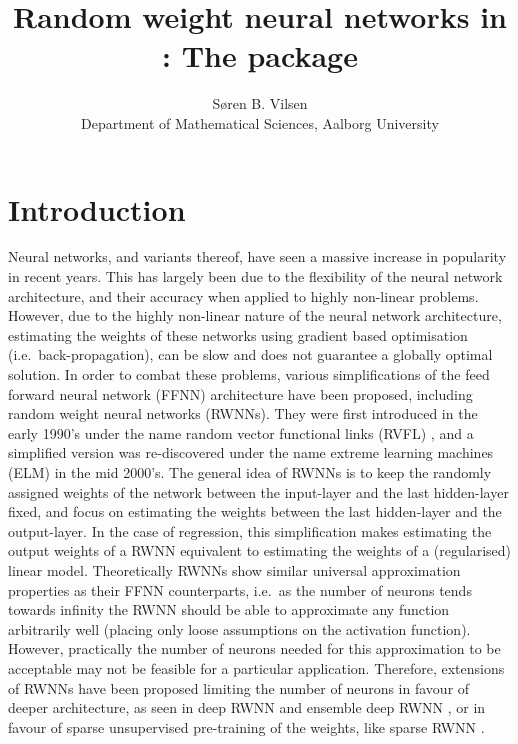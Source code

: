 \documentclass[
]{jss}
\author{
Søren B. Vilsen\\Department of Mathematical Sciences, Aalborg University
}
\title{Random weight neural networks in \proglang{R}: The \pkg{RWNN}
package}
\begin{document}
\hypertarget{introduction}{%
\section{Introduction}\label{introduction}}

Neural networks, and variants thereof, have seen a massive increase in
popularity in recent years. This has largely been due to the flexibility
of the neural network architecture, and their accuracy when applied to
highly non-linear problems. However, due to the highly non-linear nature
of the neural network architecture, estimating the weights of these
networks using gradient based optimisation (i.e.~back-propagation), can
be slow and does not guarantee a globally optimal solution. In order to
combat these problems, various simplifications of the feed forward
neural network (FFNN) architecture have been proposed, including random
weight neural networks (RWNNs). They were first introduced in the early
1990's under the name random vector functional links (RVFL)
\citep[\citet{Pao1994}]{Schmidt1992}, and a simplified version was
re-discovered under the name extreme learning machines (ELM)
\citep{Huang2006} in the mid 2000's. The general idea of RWNNs is to
keep the randomly assigned weights of the network between the
input-layer and the last hidden-layer fixed, and focus on estimating the
weights between the last hidden-layer and the output-layer. In the case
of regression, this simplification makes estimating the output weights
of a RWNN equivalent to estimating the weights of a (regularised) linear
model. Theoretically RWNNs show similar universal approximation
properties as their FFNN counterparts, i.e.~as the number of neurons
tends towards infinity the RWNN should be able to approximate any
function arbitrarily well (placing only loose assumptions on the
activation function). However, practically the number of neurons needed
for this approximation to be acceptable may not be feasible for a
particular application. Therefore, extensions of RWNNs have been
proposed limiting the number of neurons in favour of deeper
architecture, as seen in deep RWNN \citep{Henriquez2018} and ensemble
deep RWNN \citep{Shi2021}, or in favour of sparse unsupervised
pre-training of the weights, like sparse RWNN \citep{Zhang2019}.
\end{document}
